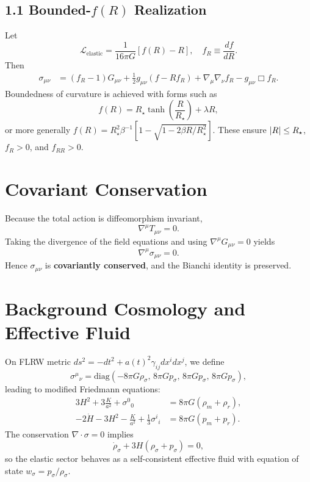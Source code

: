 \documentclass[12pt,a4paper]{article}
\begin{document}
\subsection*{1.1 Bounded-$f(R)$ Realization}
Let
\begin{equation}
\mathcal{L}_{\mathrm{elastic}}=\frac{1}{16\pi G}[f(R)-R], \quad f_R\equiv\frac{df}{dR}.
\end{equation}
Then
\begin{align}
\sigma_{\mu\nu} &= (f_R-1)G_{\mu\nu} + \frac{1}{2}g_{\mu\nu}(f-Rf_R) + \nabla_{\mu}\nabla_{\nu}f_R - g_{\mu\nu}\Box f_R.
\end{align}
Boundedness of curvature is achieved with forms such as
\begin{equation}
f(R)=R_\star\tanh\!\left(\frac{R}{R_\star}\right)+\lambda R,
\end{equation}
or more generally $f(R)=R_\star^2 \beta^{-1}[1-\sqrt{1-2\beta R/R_\star^2}]$.
These ensure $\abs{R}\le R_\star$, $f_R>0$, and $f_{RR}>0$.

\section{Covariant Conservation}
Because the total action is diffeomorphism invariant,
\begin{equation}
\nabla^\mu T_{\mu\nu}=0.
\end{equation}
Taking the divergence of the field equations and using $\nabla^\mu G_{\mu\nu}=0$ yields
\begin{equation}
\nabla^\mu\sigma_{\mu\nu}=0.
\end{equation}
Hence $\sigma_{\mu\nu}$ is \textbf{covariantly conserved}, and the Bianchi identity is preserved.

\section{Background Cosmology and Effective Fluid}
On FLRW metric $ds^2=-dt^2+a(t)^2\gamma_{ij}dx^i dx^j$, we define
\[
\sigma^\mu{}_\nu = \mathrm{diag}(-8\pi G\rho_\sigma,\,8\pi G p_\sigma,\,8\pi G p_\sigma,\,8\pi G p_\sigma),
\]
leading to modified Friedmann equations:
\begin{align}
3H^2+3\frac{K}{a^2}+\sigma^0{}_0 &= 8\pi G(\rho_m+\rho_r),\\
-2\dot H - 3H^2 - \frac{K}{a^2} + \tfrac{1}{3}\sigma^i{}_i &= 8\pi G(p_m+p_r).
\end{align}
The conservation $\nabla\cdot\sigma=0$ implies
\begin{equation}
\dot\rho_\sigma + 3H(\rho_\sigma+p_\sigma)=0,
\end{equation}
so the elastic sector behaves as a self-consistent effective fluid with equation of state $w_\sigma=p_\sigma/\rho_\sigma$.
\end{document}
